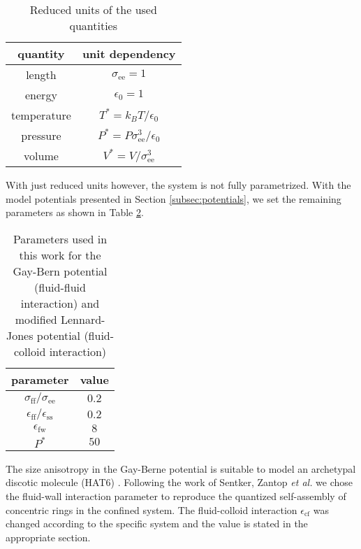 \begin{table}[H]
    \centering
    \begin{tabular}{|c|c|}
    \hline
        quantity  & unit dependency \\ \hline \hline
        length  &  $\sigma_{\text{ee}} = 1$ \\ \hline
        energy  & $\epsilon_0 =1 $ \\ \hline
        temperature & $T^{*} = k_{B}T/\epsilon_0$ \\ \hline
        pressure & $P^{*} = P\sigma_{\text{ee}}^3/\epsilon_0 $\\ \hline
        volume & $V^{*} = V/\sigma_{\text{ee}}^3 $\\ \hline
    \end{tabular}
    \caption{Reduced units of the used quantities}
    \label{tab:reducedunits}
\end{table}
With just reduced units however, the system is not fully parametrized. With the model potentials presented in Section \ref{subsec:potentials}, we set the remaining parameters as shown in Table \ref{tab:modelparam}.
\begin{table}[H]
    \centering
    \begin{tabular}{|c|c|}
    \hline
        parameter & value\\ \hline \hline
        $ \sigma_{\text{ff}}/\sigma_{\text{ee}} $ & $ 0.2$ \\ \hline
        $\epsilon_{\text{ff}}/\epsilon_{\text{ss}} $ & $ 0.2$\\ \hline
        $\epsilon_{\text{fw}} $ & $ 8$ \\ \hline
        $P^*$ & $ 50 $ \\ \hline
    \end{tabular}
    \caption{Parameters used in this work for the Gay-Bern potential (fluid-fluid interaction) and modified Lennard-Jones potential (fluid-colloid interaction) }
    \label{tab:modelparam}
\end{table}
The size anisotropy in the Gay-Berne potential is suitable to model an archetypal discotic molecule (HAT6) \cite{sentker2018quantized,caprion2003influence}. Following the work of Sentker, Zantop \textit{et al.} \cite{sentker2018quantized} we chose the fluid-wall interaction parameter to reproduce the quantized self-assembly of concentric rings in the confined system. The fluid-colloid interaction $\epsilon_{\text{cf}}$ was changed according to the specific system and the value is stated in the appropriate section.

